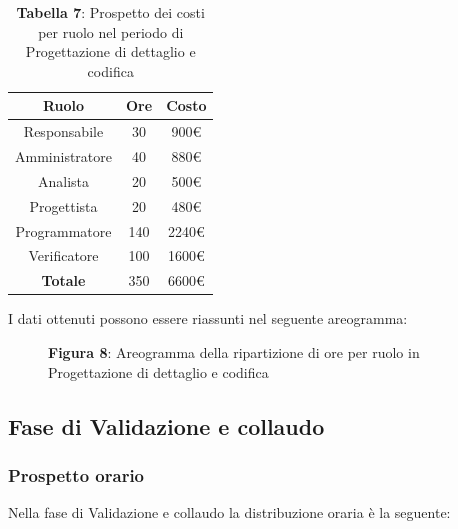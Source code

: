 \begin{table}[H]
	\centering
	\renewcommand{\arraystretch}{1.5}
	\begin{tabular}{|c|c|c|}
		\hline
		\rowcolor{lighter-grayer}
Ruolo & Ore & Costo \\ \hline
Responsabile & 30 & 900\euro \\ \hline
Amministratore & 40 & 880\euro \\ \hline
Analista & 20 & 500\euro \\ \hline
Progettista & 20 & 480\euro \\ \hline
Programmatore & 140 & 2240\euro \\ \hline
Verificatore & 100 & 1600\euro \\ \hline
\textbf{Totale} & 350 & 6600\euro \\ \hline
	\end{tabular}
	\caption*{\textbf{Tabella 7}: Prospetto dei costi per ruolo nel periodo di Progettazione di dettaglio e codifica\\}
\end{table}

I dati ottenuti possono essere riassunti nel seguente areogramma:


\begin{figure}[H]
	\centering
	\caption*{\textbf{Figura 8}: Areogramma della ripartizione di ore per ruolo in Progettazione di dettaglio e codifica}
	\label{fig:Figura10}
\end{figure}

\subsection{Fase di Validazione e collaudo}
\subsubsection{Prospetto orario}
Nella fase di Validazione e collaudo la distribuzione oraria è la seguente:


